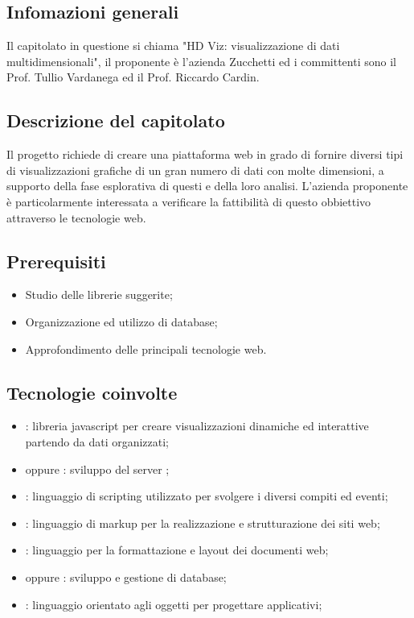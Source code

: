 
\subsection{Infomazioni generali}
Il capitolato in questione si chiama "HD Viz: visualizzazione di dati multidimensionali", il proponente è l'azienda Zucchetti ed i committenti sono il Prof. Tullio Vardanega ed il Prof. Riccardo Cardin.

\subsection{Descrizione del capitolato}
Il progetto richiede di creare una piattaforma web in grado di fornire diversi tipi di visualizzazioni grafiche di un gran numero di dati con molte dimensioni, a supporto della fase esplorativa di questi e della loro analisi. 
L’azienda proponente è particolarmente interessata a verificare la fattibilità di questo obbiettivo attraverso le tecnologie web.

\subsection{Prerequisiti}
\begin{itemize}
\item Studio delle librerie suggerite;
\item Organizzazione ed utilizzo di database;
\item Approfondimento delle principali tecnologie web.
\end{itemize}

\subsection{Tecnologie coinvolte}
\begin{itemize}
\item {}: libreria javascript per creare visualizzazioni dinamiche ed interattive partendo da dati organizzati;
\item {} oppure : sviluppo del server ;
\item {}: linguaggio di scripting utilizzato per svolgere i diversi compiti ed eventi;
\item {}: linguaggio di markup per la realizzazione e strutturazione dei siti web;
\item {}: linguaggio per la formattazione e layout dei documenti web;
\item {} oppure : sviluppo e gestione di database;
\item {}: linguaggio orientato agli oggetti per progettare applicativi;
\end{itemize}

